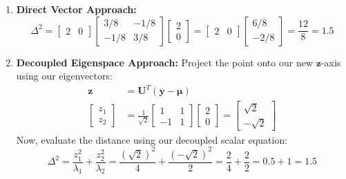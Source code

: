 \documentclass{article}
\begin{document}
\begin{enumerate}
    \item \textbf{Direct Vector Approach:}
    \begin{equation*}
    \Delta^2 = \begin{bmatrix} 2 & 0 \end{bmatrix} \begin{bmatrix} 3/8 & -1/8 \\ -1/8 & 3/8 \end{bmatrix} \begin{bmatrix} 2 \\ 0 \end{bmatrix} = \begin{bmatrix} 2 & 0 \end{bmatrix} \begin{bmatrix} 6/8 \\ -2/8 \end{bmatrix} = \frac{12}{8} = \mathbf{1.5}
    \end{equation*}
    
    \item \textbf{Decoupled Eigenspace Approach:} Project the point onto our new $\mathbf{z}$-axis using our eigenvectors:
    \begin{align*}
    \mathbf{z} &= \mathbf{U}^T (\mathbf{y} - \boldsymbol{\mu}) \\
    \begin{bmatrix} z_1 \\ z_2 \end{bmatrix} &= \frac{1}{\sqrt{2}} \begin{bmatrix} 1 & 1 \\ -1 & 1 \end{bmatrix} \begin{bmatrix} 2 \\ 0 \end{bmatrix} = \begin{bmatrix} \sqrt{2} \\ -\sqrt{2} \end{bmatrix}
    \end{align*}
    Now, evaluate the distance using our decoupled scalar equation:
    \begin{equation*}
    \Delta^2 = \frac{z_1^2}{\lambda_1} + \frac{z_2^2}{\lambda_2} = \frac{(\sqrt{2})^2}{4} + \frac{(-\sqrt{2})^2}{2} = \frac{2}{4} + \frac{2}{2} = 0.5 + 1 = \mathbf{1.5}
    \end{equation*}
\end{enumerate}
\end{document}
